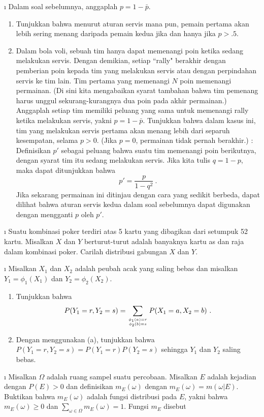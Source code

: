 \begin{LJSItem}
\i\label{exer 5.1.15.5}
Dalam soal sebelumnya, anggaplah $p = 1 - \bar{p}$.
\begin{enumerate}
\item  Tunjukkan bahwa menurut aturan servis mana pun, pemain pertama akan lebih sering menang daripada pemain kedua
jika dan hanya jika $p > .5$.
\item
Dalam bola voli, sebuah tim hanya dapat memenangi poin ketika sedang melakukan servis.  Dengan demikian, setiap
``rally" berakhir dengan pemberian poin kepada tim yang melakukan servis atau dengan perpindahan servis
ke tim lain.  Tim pertama yang memenangi $N$ poin memenangi permainan.  (Di sini kita mengabaikan 
syarat tambahan bahwa tim pemenang harus unggul sekurang-kurangnya dua poin pada akhir
permainan.)  Anggaplah setiap tim memiliki peluang yang sama untuk memenangi rally ketika melakukan servis, yakni 
$p = 1 - \bar{p}$.  Tunjukkan bahwa dalam kasus ini, tim yang melakukan servis pertama akan menang lebih dari separuh
kesempatan, selama $p > 0$.  (Jika $p = 0$, permainan tidak pernah berakhir.)  : Definisikan $p'$ sebagai
peluang bahwa suatu tim memenangi poin berikutnya, dengan syarat tim itu sedang melakukan servis.  Jika kita tulis $q = 1 -
p$, maka dapat ditunjukkan bahwa 
$$p' = \frac p{1-q^2}\ .$$
Jika sekarang permainan ini ditinjau dengan cara yang sedikit berbeda, dapat dilihat bahwa aturan servis kedua
dalam soal sebelumnya dapat digunakan dengan mengganti $p$ oleh $p'$.
\end{enumerate} 

\i\label{exer 5.1.19} Suatu kombinasi poker terdiri atas 5 kartu yang dibagikan dari setumpuk 52 kartu.  Misalkan $X$
dan $Y$ berturut-turut adalah banyaknya kartu as dan raja dalam kombinasi poker.  Carilah distribusi
gabungan $X$ dan $Y$.

\i\label{exer 5.1.24.5} Misalkan $X_1$ dan $X_2$ adalah peubah acak yang saling bebas dan misalkan $Y_1 =
\phi_1(X_1)$ dan $Y_2 = \phi_2(X_2)$.
\begin{enumerate}

\item Tunjukkan bahwa
$$ P(Y_1 = r, Y_2 = s) = \sum_{\phi_1(a) = r \atop \phi_2(b) = s} P(X_1 = a, X_2 = b)\ .
$$

\item Dengan menggunakan (a), tunjukkan bahwa $P(Y_1 = r, Y_2 = s) = P(Y_1 = r)P(Y_2 = s)$ sehingga $Y_1$ dan
$Y_2$ saling bebas.
\end{enumerate}

\i\label{exer 4.1.32} Misalkan $\Omega$ adalah ruang sampel suatu percobaan.  Misalkan $E$ adalah
kejadian dengan $P(E) > 0$ dan definisikan $m_E(\omega)$ dengan
$m_E(\omega) = m(\omega|E)$.  Buktikan bahwa $m_E(\omega)$ adalah fungsi distribusi pada
$E$, yakni bahwa $m_E(\omega) \geq 0$ dan $\sum_{\omega\in\Omega}
m_E(\omega) = 1$.  Fungsi $m_E$ disebut 


\end{LJSItem}
